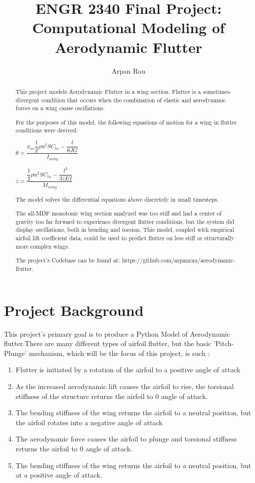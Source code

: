 \documentclass[]{article}
\title{ENGR 2340 Final Project: Computational Modeling of Aerodynamic Flutter}
\author{Arpan Rau}
\begin{document}
\maketitle

\begin{abstract}

This project models Aerodynamic Flutter in a wing section. Flutter is a sometimes-divergent condition that occurs when the combination of elastic and aerodynamic forces on a wing cause oscillations.

For the purposes of this model, the following equations of motion for a wing in flutter conditions were derived:

$\ddot{\theta} = \dfrac{x_{ac} \dfrac{1}{2} \rho u^2 S C_{l\alpha} - \dfrac{l}{\theta JG}}{I_{wing}}$


$\ddot{z} = \dfrac{\dfrac{1}{2} \rho u^2 S C_{l\alpha}-\dfrac{l^3}{3zEI}}{M_{wing}}$

The model solves the differential equations above discretely in small timesteps.

The all-MDF monotonic wing section analyzed was too stiff and had a center of gravity too far forward to experience divergent flutter conditions, but the system did display oscillations, both in bending and torsion. This model, coupled with empirical airfoil lift coefficient data, could be used to predict flutter on less stiff or structurally more complex wings. 

The project's Codebase can be found at:
 https://github.com/arpanrau/aerodynamic-flutter. 




\end{abstract}

\section{Project Background}

This project's primary goal is to produce a Python Model of Aerodynamic flutter.There are many different types of airfoil flutter, but the basic 'Pitch-Plunge' mechanism, which will be the focus of this project, is such :

\begin{enumerate}
	\item Flutter is initiated by a rotation of the airfoil to a positive angle of attack
	\item As the increased aerodynamic lift causes the airfoil to rise, the torsional stiffness of the structure returns the airfoil to 0 angle of attack.
	\item The bending stiffness of the wing returns the airfoil to a neutral position, but the airfoil rotates into a negative angle of attack
	\item The aerodynamic force causes the airfoil to plunge and torsional stiffness returns the airfoil to 0 angle of attack.
	\item The bending stiffness of the wing returns the airfoil to a neutral position, but at a positive angle of attack.
\end{enumerate}
\end{document}
